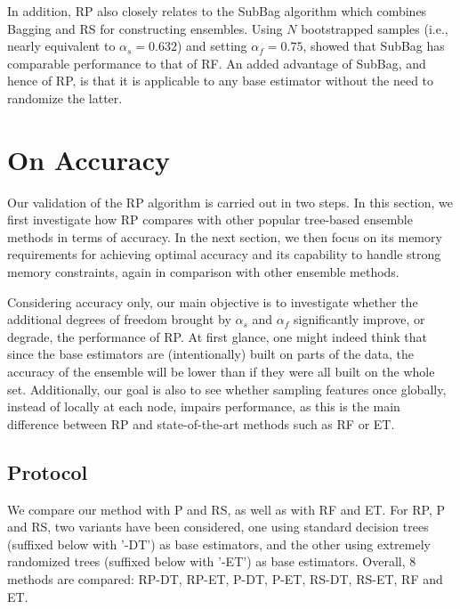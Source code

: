 In addition, RP also closely relates to the SubBag algorithm
which combines Bagging and RS for constructing ensembles. Using $N$
bootstrapped samples (i.e., nearly equivalent to $\alpha_s=0.632$) and setting
$\alpha_f=0.75$, \citet{panov:2007} showed that SubBag has comparable performance to that of
RF. An added advantage of SubBag, and hence of RP, is that it is applicable to
any base estimator without the need to randomize the latter.


\section{On Accuracy}
\label{sec:9:accuracy}

Our validation of the RP algorithm is carried out in two
steps. In this section, we first investigate how RP compares with
other popular tree-based ensemble methods in terms of accuracy. In the
next section, we then focus on its memory requirements for
achieving optimal accuracy and its capability to handle strong memory
constraints, again in comparison with other ensemble methods.

Considering accuracy only, our main objective is to investigate whe\-ther the
additional degrees of freedom brought by $\alpha_s$ and $\alpha_f$ significantly improve,
or degrade, the performance of RP. At first glance, one might indeed think that
since the base estimators are (intentionally) built on parts of the data, the
accuracy of the ensemble will be lower than if they were all built on the whole
set. Additionally, our goal is also to see whether sampling features once
globally, instead of locally at each node, impairs performance, as this is the
main difference between RP and state-of-the-art methods such as RF or ET.

\subsection{Protocol}

We compare our method with P and RS, as well as with RF and ET. For RP, P and
RS, two variants have been considered, one using standard decision trees
(suffixed below with '-DT') as base estimators, and the other using extremely
randomized trees (suffixed below with '-ET') as base estimators.  Overall, 8
methods are compared: RP-DT, RP-ET, P-DT, P-ET, RS-DT, RS-ET, RF and ET.

